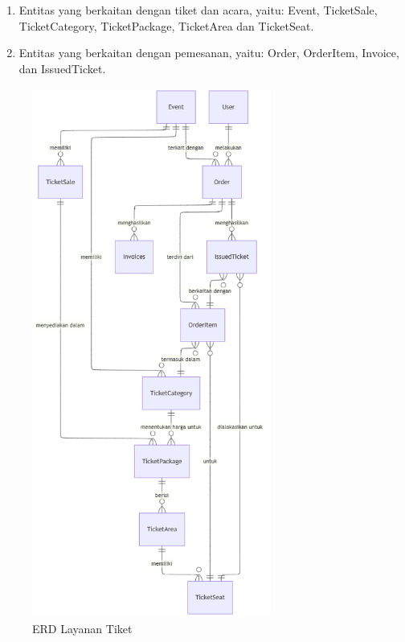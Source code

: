 \begin{enumerate}
    \item Entitas yang berkaitan dengan tiket dan acara, yaitu: Event, TicketSale, TicketCategory, TicketPackage, TicketArea dan TicketSeat.
    \item Entitas yang berkaitan dengan pemesanan, yaitu: Order, OrderItem, Invoice, dan IssuedTicket.
\end{enumerate}


\begin{figure}[htbp]
    \centering
    \includegraphics[width=0.7\textwidth]{resources/chapter-3/erd-mini.png}
    \caption{ERD Layanan Tiket}
    \label{fig:erd-ticket-service}
\end{figure}

